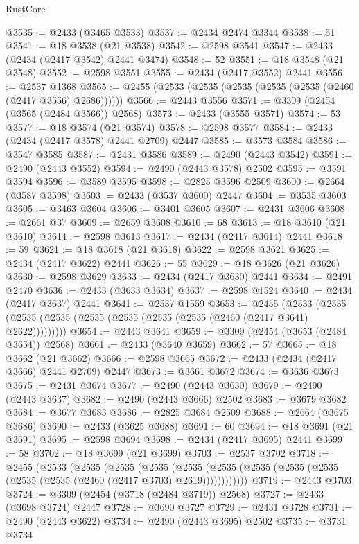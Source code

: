 \begin{lexlean}{RustCore}
\begin{coremodule}
@3535 := @2433 (@3465 @3533)
@3537 := @2434 @2474 @3344
@3538 := 51
@3541 := @18 @3538 (@21 @3538)
@3542 := @2598 @3541
@3547 := @2433 (@2434 (@2417 @3542) @2441 @3474)
@3548 := 52
@3551 := @18 @3548 (@21 @3548)
@3552 := @2598 @3551
@3555 := @2434 (@2417 @3552) @2441
@3556 := @2537 @1368
@3565 := @2455 (@2533 (@2535 (@2535 (@2535 (@2535 (@2460 (@2417 @3556) @2686))))))
@3566 := @2443 @3556
@3571 := @3309 (@2454 (@3565 (@2484 @3566)) @2568)
@3573 := @2433 (@3555 @3571)
@3574 := 53
@3577 := @18 @3574 (@21 @3574)
@3578 := @2598 @3577
@3584 := @2433 (@2434 (@2417 @3578) @2441 @2709) @2447
@3585 := @3573 @3584
@3586 := @3547 @3585
@3587 := @2431 @3586
@3589 := @2490 (@2443 @3542)
@3591 := @2490 (@2443 @3552)
@3594 := @2490 (@2443 @3578) @2502
@3595 := @3591 @3594
@3596 := @3589 @3595
@3598 := @2825 @3596 @2509
@3600 := @2664 (@3587 @3598)
@3603 := @2433 (@3537 @3600) @2447
@3604 := @3535 @3603
@3605 := @3463 @3604
@3606 := @3401 @3605
@3607 := @2431 @3606
@3608 := @2661 @37
@3609 := @2659 @3608
@3610 := 68
@3613 := @18 @3610 (@21 @3610)
@3614 := @2598 @3613
@3617 := @2434 (@2417 @3614) @2441
@3618 := 59
@3621 := @18 @3618 (@21 @3618)
@3622 := @2598 @3621
@3625 := @2434 (@2417 @3622) @2441
@3626 := 55
@3629 := @18 @3626 (@21 @3626)
@3630 := @2598 @3629
@3633 := @2434 (@2417 @3630) @2441
@3634 := @2491 @2470
@3636 := @2433 (@3633 @3634)
@3637 := @2598 @1524
@3640 := @2434 (@2417 @3637) @2441
@3641 := @2537 @1559
@3653 := @2455
    (@2533 (@2535 (@2535 (@2535 (@2535 (@2535 (@2535 (@2535 (@2460 (@2417 @3641) @2622)))))))))
@3654 := @2443 @3641
@3659 := @3309 (@2454 (@3653 (@2484 @3654)) @2568)
@3661 := @2433 (@3640 @3659)
@3662 := 57
@3665 := @18 @3662 (@21 @3662)
@3666 := @2598 @3665
@3672 := @2433 (@2434 (@2417 @3666) @2441 @2709) @2447
@3673 := @3661 @3672
@3674 := @3636 @3673
@3675 := @2431 @3674
@3677 := @2490 (@2443 @3630)
@3679 := @2490 (@2443 @3637)
@3682 := @2490 (@2443 @3666) @2502
@3683 := @3679 @3682
@3684 := @3677 @3683
@3686 := @2825 @3684 @2509
@3688 := @2664 (@3675 @3686)
@3690 := @2433 (@3625 @3688)
@3691 := 60
@3694 := @18 @3691 (@21 @3691)
@3695 := @2598 @3694
@3698 := @2434 (@2417 @3695) @2441
@3699 := 58
@3702 := @18 @3699 (@21 @3699)
@3703 := @2537 @3702
@3718 := @2455
    (@2533
      (@2535
        (@2535
          (@2535
            (@2535 (@2535 (@2535 (@2535 (@2535 (@2535 (@2535 (@2460 (@2417 @3703) @2619))))))))))))
@3719 := @2443 @3703
@3724 := @3309 (@2454 (@3718 (@2484 @3719)) @2568)
@3727 := @2433 (@3698 @3724) @2447
@3728 := @3690 @3727
@3729 := @2431 @3728
@3731 := @2490 (@2443 @3622)
@3734 := @2490 (@2443 @3695) @2502
@3735 := @3731 @3734

\end{coremodule}
\end{lexlean}
